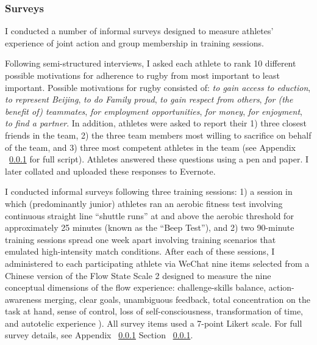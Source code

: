 
\subsubsection{Surveys}

 I conducted a number of informal surveys designed to measure athletes' experience of joint action and group membership in training sessions.

   Following semi-structured interviews, I asked each athlete to rank 10 different possible motivations for adherence to rugby from most important to least important. Possible motivations for rugby consisted of: \textit{to gain access to eduction}, \textit{to represent Beijing}, \textit{to do Family proud}, \textit{to gain respect from others}, \textit{for (the benefit of) teammates}, \textit{for employment opportunities}, \textit{for money}, \textit{for enjoyment}, \textit{to find a partner}. In addition, athletes were asked to report their 1) three closest friends in the team, 2) the three team members most willing to sacrifice on behalf of the team, and 3) three most competent athletes in the team (see Appendix ~\ref{} for full script). Athletes answered these questions using a pen and paper. I later collated and uploaded these responses to Evernote.


  I conducted informal surveys following three training sessions: 1) a session in which (predominantly junior) athletes ran an aerobic fitness test involving continuous straight line ``shuttle runs''  at and above the aerobic threshold for approximately 25 minutes (known as the ``Beep Test''), and 2) two 90-minute training sessions spread one week apart involving training scenarios that emulated high-intensity match conditions.  After each of these sessions, I administered to each participating athlete via WeChat nine items selected from a Chinese version of the Flow State Scale 2 \citep{Liu2012} designed to measure the nine conceptual dimensions of the flow experience: challenge-skills balance, action-awareness merging, clear goals, unambiguous feedback, total concentration on the task at hand, sense of control, loss of self-consciousness, transformation of time, and autotelic experience \citep{Csikszentmihalyi1990}).  All survey items used a 7-point Likert scale. For full survey details, see Appendix ~\ref{} Section ~\ref{}.

